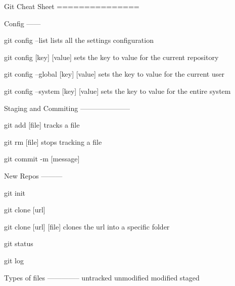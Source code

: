 \documentclass[twocolumn]{article}
\begin{document}
Git Cheat Sheet
===============

Config
------

git config --list
	lists all the settings configuration

git config [key] [value]
	sets the key to value for the current repository

git config --global [key] [value]
	sets the key to value for the current user

git config --system [key] [value]
	sets the key to value for the entire system

Staging and Commiting
---------------------

git add [file]
	tracks a file

git rm [file]
	stops tracking a file

git commit -m [message]

New Repos
---------

git init

git clone [url]

git clone [url] [file]
	clones the url into a specific folder

git status

git log

Types of files
--------------
untracked
unmodified
modified
staged
\end{document}
